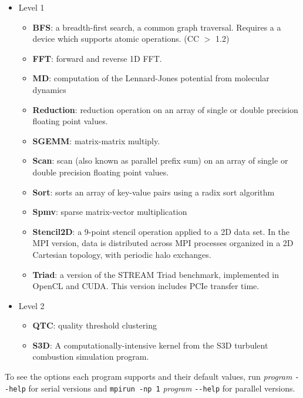 \documentclass[11pt]{article}
\begin{document}
\begin{itemize}
\item Level 1
    \begin{itemize}
        \item {\bf BFS}: a breadth-first search, a common graph traversal. Requires a
        a device which supports atomic operations. (CC $>$ 1.2)
        \item {\bf FFT}: forward and reverse 1D FFT.
        \item {\bf MD}: computation of the Lennard-Jones potential from molecular dynamics
        \item {\bf Reduction}: reduction operation on an array of single
        or double precision floating point values.
        \item {\bf SGEMM}: matrix-matrix multiply.
        \item {\bf Scan}: scan (also known as parallel prefix sum) on an array 
        of single or double precision floating point values.
        \item {\bf Sort}: sorts an array of key-value pairs using a radix sort 
        algorithm
        \item {\bf Spmv}: sparse matrix-vector multiplication
        \item {\bf Stencil2D}: a 9-point stencil operation applied to a 2D data
        set. In the MPI version, data is distributed across MPI processes
        organized in a 2D Cartesian topology, with periodic halo exchanges.
        \item {\bf Triad}: a version of the STREAM Triad benchmark, implemented 
        in OpenCL and CUDA. This version includes PCIe transfer time.
    \end{itemize}
\item{Level 2}
    \begin{itemize}
        \item {\bf QTC}: quality threshold clustering
        \item {\bf S3D}: A computationally-intensive kernel from the 
        S3D turbulent combustion simulation program\cite{s3d}.
    \end{itemize}
\end{itemize}
    
To see the options each program supports and their default values, run 
{\it program} \verb+--help+ for serial versions and \verb+mpirun -np 1+ {\it program} \verb+--help+
for parallel versions.
\end{document}
